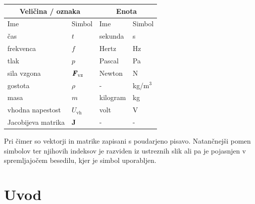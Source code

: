 \documentclass[a4paper,twoside,openright,12pt,slovene]{book}
\begin{document}
\begin{center}
    \begin{tabular}{*{4}{l}} \hline
        \multicolumn{2}{c}{\bf{Veličina / oznaka}}           & \multicolumn{2}{c}{\bf{Enota}} \\ \hline
        Ime                & Simbol                          & Ime      & Simbol              \\ \hline
        čas                & $t$                             & sekunda  & s                   \\
        frekvenca          & $f$                             & Hertz    & Hz                  \\
        tlak               & $p$                             & Pascal   & Pa                  \\
        sila vzgona        & $\textbf{\textit{F}}_\text{vz}$ & Newton   & N                   \\
        gostota            & $\rho$                          & -        & kg/m$^3$            \\
        masa               & $m$                             & kilogram & kg                  \\
        vhodna napestost   & $U_\text{vh}$                   & volt     & V                   \\
        Jacobijeva matrika & $\mathbf{J}$                    & -        & -                   \\ \hline
    \end{tabular}
\end{center}

Pri čimer so vektorji in matrike zapisani s poudarjeno pisavo. Natančnejši pomen simbolov ter njihovih indeksov je razviden iz ustreznih slik ali pa je pojasnjen v spremljajočem besedilu, kjer je simbol uporabljen.

\mainmatter

\chapter{Uvod} \label{uvod}
\end{document}
